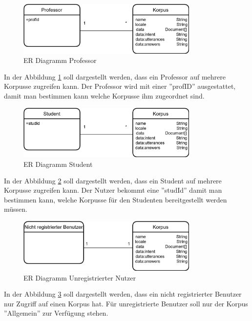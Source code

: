 \begin{figure}[H]
    \centering
    \includegraphics[width=0.8\textwidth]{bilder/technologien/ER-Prof.png}
    \caption{ER Diagramm Professor}
    \label{fig:ER_Diagramm_Professor}
\end{figure}

\noindent In der Abbildung \ref{fig:ER_Diagramm_Professor} soll dargestellt werden, dass ein Professor auf mehrere Korpusse zugreifen kann.
Der Professor wird mit einer ''profID'' ausgestattet, 
damit man bestimmen kann welche Korpusse ihm zugeordnet sind.

\begin{figure}[H]
    \centering
    \includegraphics[width=0.8\textwidth]{bilder/technologien/ER-Student.png}
    \caption{ER Diagramm Student}
    \label{fig:ER_Diagramm_Student}
\end{figure}

\noindent In der Abbildung \ref{fig:ER_Diagramm_Student} soll dargestellt werden, dass ein Student auf mehrere Korpusse zugreifen kann.
Der Nutzer bekommt eine ''studId'' damit man bestimmen kann, 
welche Korpusse für den Studenten bereitgestellt werden müssen.

\begin{figure}[H]
    \centering
    \includegraphics[width=0.8\textwidth]{bilder/technologien/ER-UUser.png}
    \caption{ER Diagramm Unregistrierter Nutzer}
    \label{fig:ER_Diagramm_UUser}
\end{figure}

\noindent In der Abbildung \ref{fig:ER_Diagramm_UUser} soll dargestellt werden, dass ein nicht registrierter Benutzer nur Zugriff auf einen Korpus hat.
Für unregistrierte Benutzer soll nur der Korpus ''Allgemein'' zur Verfügung stehen.
